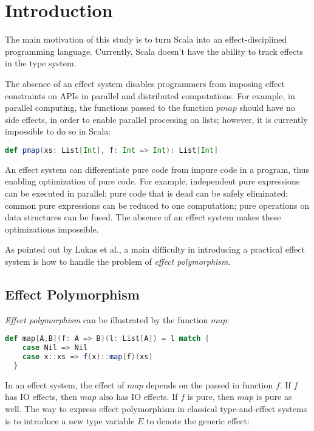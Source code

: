 \section{Introduction}

The main motivation of this study is to turn Scala into an
effect-disciplined programming language. Currently, Scala doesn't have
the ability to track effects in the type system.

The absence of an effect system disables programmers from imposing
effect constraints on APIs in parallel and distributed
computations. For example, in parallel computing, the functions passed
to the function $pmap$ should have no side effects, in order to enable
parallel processing on lists; however, it is currently impossible to
do so in Scala:

\begin{lstlisting}[language=Scala]
def pmap(xs: List[Int], f: Int => Int): List[Int]
\end{lstlisting}

An effect system can differentiate pure code from impure code in a
program, thus enabling optimization of pure code. For example,
independent pure expressions can be executed in parallel; pure code
that is dead can be safely eliminated; common pure expressions can be
reduced to one computation; pure operations on data structures can be
fused\cite{coutts2007stream}. The absence of an effect system makes
these optimizations impossible.

As pointed out by Lukas et al.\cite{rytz2012lightweight}, a main
difficulty in introducing a practical effect system is how to handle
the problem of \emph{effect polymorphism}.

\subsection{Effect Polymorphism}

\emph{Effect polymorphism} can be illustrated by the function $map$:

\begin{lstlisting}[language=Scala]
  def map[A,B](f: A => B)(l: List[A]) = l match {
    case Nil => Nil
    case x::xs => f(x)::map(f)(xs)
  }
\end{lstlisting}

In an effect system, the effect of $map$ depends on the passed in
function $f$. If $f$ has IO effects, then $map$ also has IO
effects. If $f$ is pure, then $map$ is pure as well. The way to
express effect polymorphism in classical type-and-effect systems is to
introduce a new type variable $E$ to denote the generic effect:

